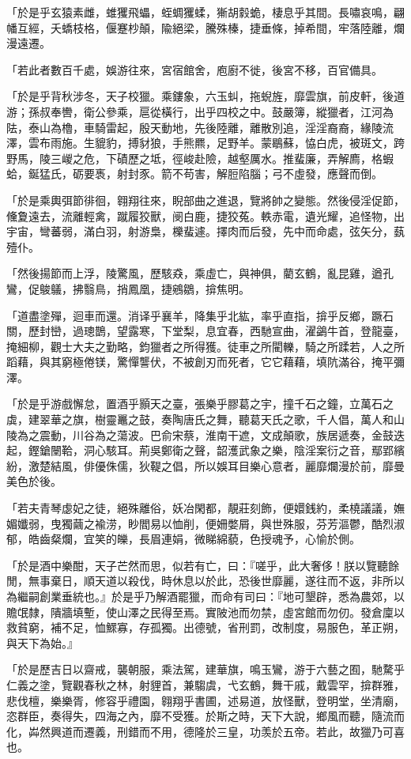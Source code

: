 \begin{pinyinscope}
「於是乎玄猿素雌，蜼玃飛蠝，蛭蜩玃蝚，獑胡豰蛫，棲息乎其間。長嘯哀鳴，翩幡互經，夭蟜枝格，偃蹇杪顛，隃絕梁，騰殊榛，捷垂條，掉希間，牢落陸離，爛漫遠遷。

「若此者數百千處，娛游往來，宮宿館舍，庖廚不徙，後宮不移，百官備具。

「於是乎背秋涉冬，天子校獵。乘鏤象，六玉虯，拖蜺旌，靡雲旗，前皮軒，後道游；孫叔奉轡，衛公參乘，扈從橫行，出乎四校之中。鼓嚴簿，縱獵者，江河為阹，泰山為櫓，車騎雷起，殷天動地，先後陸離，離散別追，淫淫裔裔，緣陵流澤，雲布雨施。生貔豹，搏豺狼，手熊羆，足野羊。蒙鶡蘇，恊白虎，被斑文，跨野馬，陵三嵕之危，下磧歷之坻，徑峻赴險，越壑厲水。推蜚廉，弄解廌，格蝦蛤，鋋猛氏，砺要褭，射封豕。箭不苟害，解脰陷腦；弓不虛發，應聲而倒。

「於是乘輿弭節徘徊，翱翔往來，睨部曲之進退，覽將帥之變態。然後侵淫促節，儵夐遠去，流離輕禽，蹴履狡獸，阌白鹿，捷狡菟。軼赤電，遺光耀，追怪物，出宇宙，彎蕃弱，滿白羽，射游梟，櫟蜚遽。擇肉而后發，先中而命處，弦矢分，蓺殪仆。

「然後揚節而上浮，陵驚風，歷駭猋，乘虛亡，與神俱，藺玄鶴，亂昆雞，遒孔鸞，促鵔鸃，拂翳鳥，捎鳳凰，捷鵷鶵，揜焦明。

「道盡塗殫，迴車而還。消译乎襄羊，降集乎北紘，率乎直指，揜乎反鄉，蹶石關，歷封巒，過璁鵲，望露寒，下堂梨，息宜春，西馳宣曲，濯鷁牛首，登龍臺，掩細柳，觀士大夫之勤略，鈞獵者之所得獲。徒車之所閵轢，騎之所蹂若，人之所蹈藉，與其窮極倦镁，驚憚讋伏，不被創刃而死者，它它藉藉，填阬滿谷，掩平彌澤。

「於是乎游戲懈怠，置酒乎顥天之臺，張樂乎膠葛之宇，撞千石之鐘，立萬石之虡，建翠華之旗，樹靈鼉之鼓，奏陶唐氏之舞，聽葛天氏之歌，千人倡，萬人和山陵為之震動，川谷為之蕩波。巴俞宋蔡，淮南干遮，文成顛歌，族居遞奏，金鼓迭起，鏗鎗闛鞈，洞心駭耳。荊吳鄭衛之聲，韶濩武象之樂，陰淫案衍之音，鄢郢繽紛，激楚結風，俳優侏儒，狄鞮之倡，所以娛耳目樂心意者，麗靡爛漫於前，靡曼美色於後。

「若夫青琴虙妃之徒，絕殊離俗，妖冶閑都，靚莊刻飾，便嬛銭約，柔橈議議，嫵媚孅弱，曳獨繭之褕涝，眇閻易以恤削，便姍嫳屑，與世殊服，芬芳漚鬱，酷烈淑郁，皓齒粲爛，宜笑的皪，長眉連娟，微睇綿藐，色授魂予，心愉於側。

「於是酒中樂酣，天子芒然而思，似若有亡，曰：『嗟乎，此大奢侈！朕以覽聽餘閒，無事棄日，順天道以殺伐，時休息以於此，恐後世靡麗，遂往而不返，非所以為繼嗣創業垂統也。』於是乎乃解酒罷獵，而命有司曰：『地可墾辟，悉為農郊，以贍氓隸，隤牆填塹，使山澤之民得至焉。實陂池而勿禁，虛宮館而勿仞。發倉廩以救貧窮，補不足，恤鰥寡，存孤獨。出德號，省刑罰，改制度，易服色，革正朔，與天下為始。』

「於是歷吉日以齋戒，襲朝服，乘法駕，建華旗，鳴玉鸞，游于六藝之囿，馳騖乎仁義之塗，覽觀春秋之林，射貍首，兼騶虞，弋玄鶴，舞干戚，戴雲罕，揜群雅，悲伐檀，樂樂胥，修容乎禮園，翱翔乎書圃，述易道，放怪獸，登明堂，坐清廟，恣群臣，奏得失，四海之內，靡不受獲。於斯之時，天下大說，鄉風而聽，隨流而化，芔然興道而遷義，刑錯而不用，德隆於三皇，功羡於五帝。若此，故獵乃可喜也。


\end{pinyinscope}
